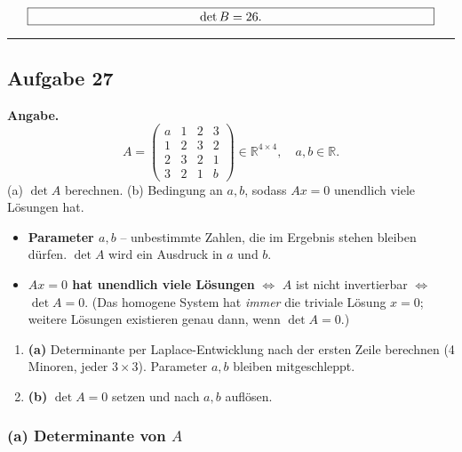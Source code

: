 \documentclass[a4paper,12pt]{article}
\begin{document}
\[
\fbox{\parbox{0.93\textwidth}{\centering
$\det B = 26$.
}}
\]

\bigskip
\hrule
\bigskip

\subsection*{Aufgabe 27}

\textbf{Angabe.}
\[
A = \begin{pmatrix} a & 1 & 2 & 3 \\ 1 & 2 & 3 & 2 \\ 2 & 3 & 2 & 1 \\ 3 & 2 & 1 & b \end{pmatrix} \in \mathbb{R}^{4\times 4},\quad a, b \in \mathbb{R}.
\]
(a) $\det A$ berechnen. \quad (b) Bedingung an $a, b$, sodass $Ax = 0$ unendlich viele L\"osungen hat.

\begin{begriffe}
\begin{itemize}[leftmargin=*, nosep]
    \item \textbf{Parameter $a, b$} -- unbestimmte Zahlen, die im Ergebnis stehen bleiben d\"urfen. $\det A$ wird ein Ausdruck in $a$ und $b$.
    \item \textbf{$Ax = 0$ hat unendlich viele L\"osungen} $\iff$ $A$ ist nicht invertierbar $\iff$ $\det A = 0$. (Das homogene System hat \emph{immer} die triviale L\"osung $x = 0$; weitere L\"osungen existieren genau dann, wenn $\det A = 0$.)
\end{itemize}
\end{begriffe}

\begin{wastun}
\begin{enumerate}[leftmargin=*, nosep]
    \item \textbf{(a)} Determinante per Laplace-Entwicklung nach der ersten Zeile berechnen (4 Minoren, jeder $3\times 3$). Parameter $a, b$ bleiben mitgeschleppt.
    \item \textbf{(b)} $\det A = 0$ setzen und nach $a, b$ aufl\"osen.
\end{enumerate}
\end{wastun}

\subsubsection*{(a) Determinante von $A$}
\end{document}
